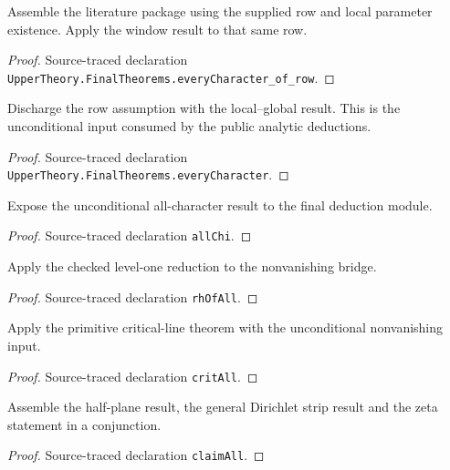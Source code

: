{\begin{theorem}
\label{ofRow}
Assemble the literature package using the supplied row and local parameter existence. Apply the window result to that same row.
\end{theorem}
\begin{proof}
Source-traced declaration \texttt{UpperTheory.FinalTheorems.everyCharacter\_of\_row}.
\end{proof}


\begin{theorem}
\label{every}
Discharge the row assumption with the local–global result. This is the unconditional input consumed by the public analytic deductions.
\end{theorem}
\begin{proof}
Source-traced declaration \texttt{UpperTheory.FinalTheorems.everyCharacter}.
\end{proof}


\begin{theorem}
\label{allChi}
Expose the unconditional all-character result to the final deduction module.
\end{theorem}
\begin{proof}
Source-traced declaration \texttt{allChi}.
\end{proof}


\begin{theorem}
\label{rhAll}
Apply the checked level-one reduction to the nonvanishing bridge.
\end{theorem}
\begin{proof}
Source-traced declaration \texttt{rhOfAll}.
\end{proof}


\begin{theorem}
\label{critAll}
Apply the primitive critical-line theorem with the unconditional nonvanishing input.
\end{theorem}
\begin{proof}
Source-traced declaration \texttt{critAll}.
\end{proof}


\begin{theorem}
\label{claimAll}
Assemble the half-plane result, the general Dirichlet strip result and the zeta statement in a conjunction.
\end{theorem}
\begin{proof}
Source-traced declaration \texttt{claimAll}.
\end{proof}


}
